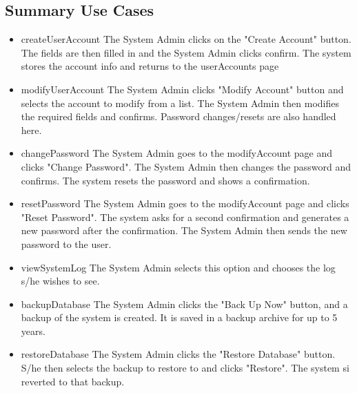 \documentclass{article}
\begin{document}
\subsection{Summary Use Cases}
\begin{itemize}
  \item createUserAccount
The System Admin clicks on the "Create Account" button. The fields are then filled in 
and the System Admin clicks confirm. The system stores the account info and returns to the userAccounts page
  \item modifyUserAccount
The System Admin clicks "Modify Account" button and selects the account to modify from a list. The System Admin 
then modifies the required fields and confirms. Password changes/resets are also handled here.
  \item changePassword
The System Admin goes to the modifyAccount page and clicks "Change Password". The System Admin then changes 
the password and confirms. The system resets the password and shows a confirmation.
  \item resetPassword
The System Admin goes to the modifyAccount page and clicks "Reset Password". The system asks for a second confirmation 
and generates a new password after the confirmation. The System Admin then sends the new password to the user.
  \item viewSystemLog
The System Admin selects this option and chooses the log s/he wishes to see.
  \item backupDatabase
The System Admin clicks the "Back Up Now" button, and a backup of the system is created. It is saved in a backup archive for up to 5 years.
  \item restoreDatabase
The System Admin clicks the "Restore Database" button. S/he then selects the backup to restore to and clicks "Restore". The system 
si reverted to that backup.


\end{itemize}
\end{document}
